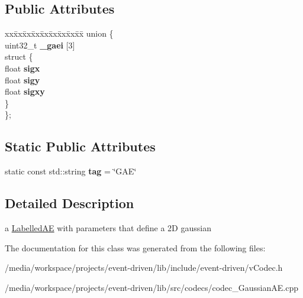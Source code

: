 \subsection*{Public Attributes}
\begin{DoxyCompactItemize}
\item 
\mbox{\label{classev_1_1GaussianAE_a13e0c15248195b159d6b672ea3596611}} 
\begin{tabbing}
xx\=xx\=xx\=xx\=xx\=xx\=xx\=xx\=xx\=\kill
union \{\\
\>uint32\_t {\bfseries \_gaei} \mbox{[}3\mbox{]}\\
\mbox{\label{unionev_1_1GaussianAE_1_1_0D13_aebead89f411b9301f4fdb56ef30ba0c0}} 
\>struct \{\\
\>\>float {\bfseries sigx}\\
\>\>float {\bfseries sigy}\\
\>\>float {\bfseries sigxy}\\
\>\} \\
\}; \\

\end{tabbing}\end{DoxyCompactItemize}
\subsection*{Static Public Attributes}
\begin{DoxyCompactItemize}
\item 
\mbox{\label{classev_1_1GaussianAE_a6d0ea5de274ddd380b056d2ba8b019e2}} 
static const std\+::string {\bfseries tag} = \char`\"{}G\+AE\char`\"{}
\end{DoxyCompactItemize}


\subsection{Detailed Description}
a \hyperlink{classev_1_1LabelledAE}{Labelled\+AE} with parameters that define a 2D gaussian 

The documentation for this class was generated from the following files\+:\begin{DoxyCompactItemize}
\item 
/media/workspace/projects/event-\/driven/lib/include/event-\/driven/v\+Codec.\+h\item 
/media/workspace/projects/event-\/driven/lib/src/codecs/codec\+\_\+\+Gaussian\+A\+E.\+cpp\end{DoxyCompactItemize}
